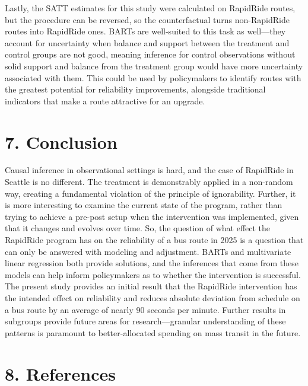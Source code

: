 \documentclass[
  12pt,
]{article}
\begin{document}
Lastly, the SATT estimates for this study were calculated on RapidRide
routes, but the procedure can be reversed, so the counterfactual turns
non-RapidRide routes into RapidRide ones. BARTs are well-suited to this
task as well---they account for uncertainty when balance and support
between the treatment and control groups are not good, meaning inference
for control observations without solid support and balance from the
treatment group would have more uncertainty associated with them. This
could be used by policymakers to identify routes with the greatest
potential for reliability improvements, alongside traditional indicators
that make a route attractive for an upgrade.

\section{7. Conclusion}\label{conclusion}

Causal inference in observational settings is hard, and the case of
RapidRide in Seattle is no different. The treatment is demonstrably
applied in a non-random way, creating a fundamental violation of the
principle of ignorability. Further, it is more interesting to examine
the current state of the program, rather than trying to achieve a
pre-post setup when the intervention was implemented, given that it
changes and evolves over time. So, the question of what effect the
RapidRide program has on the reliability of a bus route in 2025 is a
question that can only be answered with modeling and adjustment. BARTs
and multivariate linear regression both provide solutions, and the
inferences that come from these models can help inform policymakers as
to whether the intervention is successful. The present study provides an
initial result that the RapidRide intervention has the intended effect
on reliability and reduces absolute deviation from schedule on a bus
route by an average of nearly 90 seconds per minute. Further results in
subgroups provide future areas for research---granular understanding of
these patterns is paramount to better-allocated spending on mass transit
in the future.

\singlespacing

\newpage

\section{8. References}\label{references}
\end{document}
